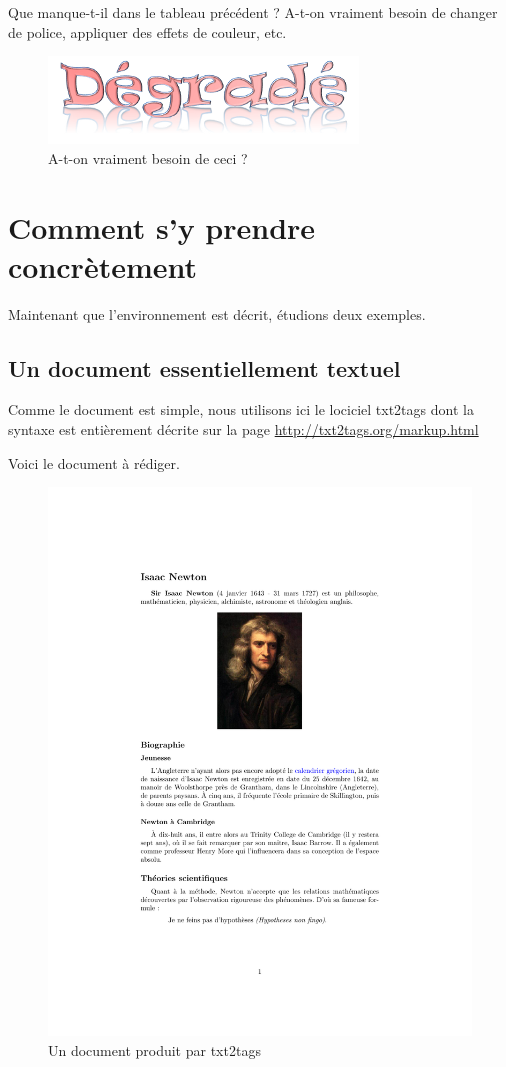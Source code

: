 \documentclass[]{article}
\makeatletter
\def\maxwidth{\ifdim\Gin@nat@width>\linewidth\linewidth
\else\Gin@nat@width\fi}
\let\Oldincludegraphics\includegraphics
\renewcommand{\includegraphics}[1]{\Oldincludegraphics[width=\maxwidth]{#1}}
\makeatother
\begin{document}
Que manque-t-il dans le tableau précédent ? A-t-on vraiment besoin de
changer de police, appliquer des effets de couleur, etc.

\begin{figure}[htbp]
\centering
\includegraphics{degrade.png}
\caption{A-t-on vraiment besoin de ceci ?}
\end{figure}

\section{Comment s'y prendre concrètement}

Maintenant que l'environnement est décrit, étudions deux exemples.

\subsection{Un document essentiellement textuel}

Comme le document est simple, nous utilisons ici le lociciel txt2tags
dont la syntaxe est entièrement décrite sur la page
\url{http://txt2tags.org/markup.html}

Voici le document à rédiger.

\begin{figure}[htbp]
\centering
\includegraphics{newton.pdf}
\caption{Un document produit par txt2tags}
\end{figure}
\end{document}
